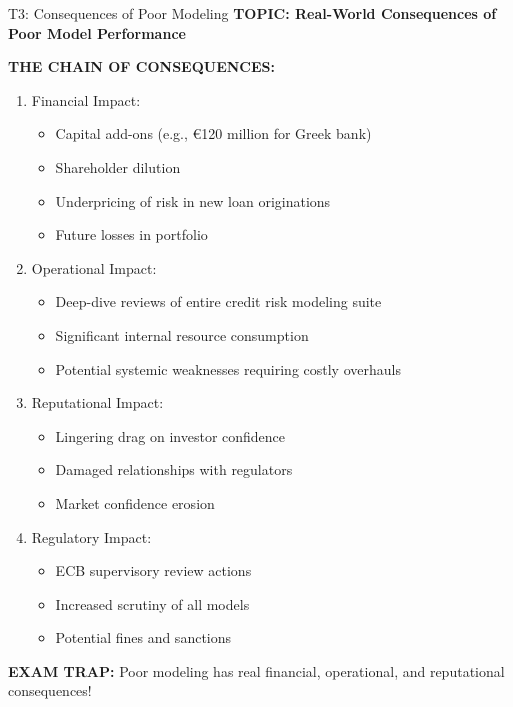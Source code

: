 \documentclass[8pt]{beamer}
\begin{document}
	\begin{frame}{T3: Consequences of Poor Modeling}
		\fontsize{6.5}{7.5}\selectfont
		\textbf{TOPIC: Real-World Consequences of Poor Model Performance}
		
		\vspace{0.1cm}
		\textbf{THE CHAIN OF CONSEQUENCES:}
		\begin{enumerate}
			\item \textcolor{myblue}{Financial Impact:}
			\begin{itemize}
				\item Capital add-ons (e.g., €120 million for Greek bank)
				\item Shareholder dilution
				\item Underpricing of risk in new loan originations
				\item Future losses in portfolio
			\end{itemize}
			
			\item \textcolor{myblue}{Operational Impact:}
			\begin{itemize}
				\item Deep-dive reviews of entire credit risk modeling suite
				\item Significant internal resource consumption
				\item Potential systemic weaknesses requiring costly overhauls
			\end{itemize}
			
			\item \textcolor{myblue}{Reputational Impact:}
			\begin{itemize}
				\item Lingering drag on investor confidence
				\item Damaged relationships with regulators
				\item Market confidence erosion
			\end{itemize}
			
			\item \textcolor{myblue}{Regulatory Impact:}
			\begin{itemize}
				\item ECB supervisory review actions
				\item Increased scrutiny of all models
				\item Potential fines and sanctions
			\end{itemize}
		\end{enumerate}
		
		\textcolor{myred}{\textbf{EXAM TRAP:}} Poor modeling has \textcolor{myblue}{real financial, operational, and reputational consequences}!
	\end{frame}
	
\end{document}

